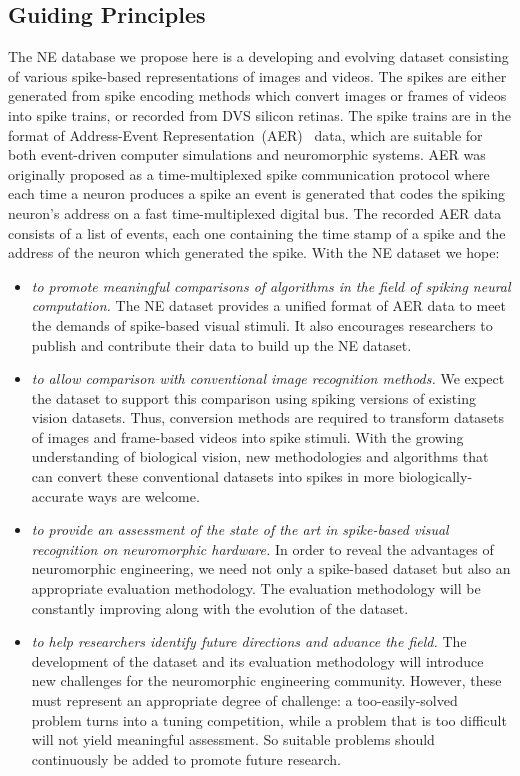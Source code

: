\documentclass{frontiersENG} %
\begin{document}
\subsection{Guiding Principles}
The NE database we propose here is a developing and evolving dataset consisting of various spike-based representations of images and videos.
The spikes are either generated from spike encoding methods which convert images or frames of videos into spike trains, or recorded from DVS silicon retinas.
The spike trains are in the format of Address-Event Representation~(AER)~\citep{mahowald1992vlsi} data, which are suitable for both event-driven computer simulations and neuromorphic systems.
AER was originally proposed as a time-multiplexed spike communication protocol where each time a neuron produces a spike an event is generated that codes the spiking neuron's address on a fast time-multiplexed digital bus.
The recorded AER data consists of a list of events, each one containing the time stamp of a spike and the address of the neuron which generated the spike.
With the NE dataset we hope:
\begin{itemize}
	\item \textit{to promote meaningful comparisons of algorithms in the field of spiking neural computation.}
	The NE dataset provides a unified format of AER data to meet the demands of spike-based visual stimuli.
	It also encourages researchers to publish and contribute their data to build up the NE dataset.
	\item \textit{to allow comparison with conventional image recognition methods.}
	We expect the dataset to support this comparison using spiking versions of existing vision datasets.
	Thus, conversion methods are required to transform datasets of images and frame-based videos into spike stimuli.
	With the growing understanding of biological vision, new methodologies and algorithms that can convert these conventional datasets into spikes in more biologically-accurate ways are welcome.
	\item \textit{to provide an assessment of the state of the art in spike-based visual recognition on neuromorphic hardware.}
	In order to reveal the advantages of neuromorphic engineering, we need not only a spike-based dataset but also an appropriate evaluation methodology.
	The evaluation methodology will be constantly improving along with the evolution of the dataset.
	\item \textit{to help researchers identify future directions and advance the field.}
	The development of the dataset and its evaluation methodology will introduce new challenges for the neuromorphic engineering community.
	However, these must represent an appropriate degree of challenge: a too-easily-solved problem turns into a tuning competition, while a problem that is too difficult will not yield meaningful assessment.
	So suitable problems should continuously be added to promote future research.  
\end{itemize}
\end{document}
